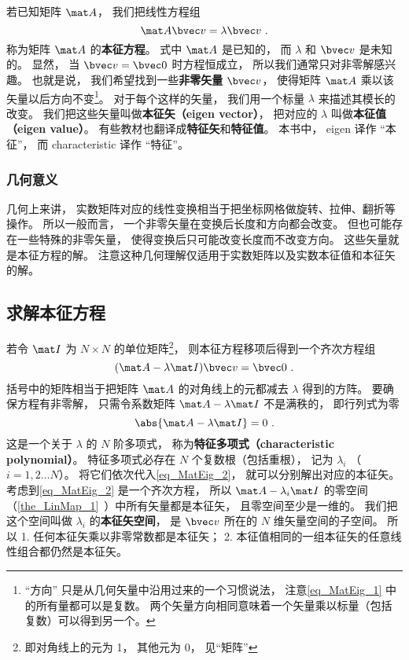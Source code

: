 

若已知矩阵 $\mat A$， 我们把线性方程组
\begin{equation}\label{eq_MatEig_1}
\mat A \bvec v = \lambda \bvec v~.
\end{equation}
称为矩阵 $\mat A$ 的\textbf{本征方程}。 式中 $\mat A$ 是已知的， 而 $\lambda$ 和 $\bvec v$ 是未知的。 显然， 当 $\bvec v = \bvec 0$ 时方程恒成立， 所以我们通常只对非零解感兴趣。 也就是说， 我们希望找到一些\textbf{非零矢量} $\bvec v$， 使得矩阵 $\mat A$ 乘以该矢量以后方向不变\footnote{“方向” 只是从几何矢量中沿用过来的一个习惯说法， 注意\autoref{eq_MatEig_1} 中的所有量都可以是复数。 两个矢量方向相同意味着一个矢量乘以标量（包括复数）可以得到另一个。}。 对于每个这样的矢量， 我们用一个标量 $\lambda$ 来描述其模长的改变。 我们把这些矢量叫做\textbf{本征矢（eigen vector）}， 把对应的 $\lambda$ 叫做\textbf{本征值（eigen value）}。 有些教材也翻译成\textbf{特征矢}和\textbf{特征值}。 本书中， eigen 译作 “本征”， 而 characteristic 译作 “特征”。

\subsubsection{几何意义}
几何上来讲， 实数矩阵对应的线性变换相当于把坐标网格做旋转、拉伸、翻折等操作。%
所以一般而言， 一个非零矢量在变换后长度和方向都会改变。 但也可能存在一些特殊的非零矢量， 使得变换后只可能改变长度而不改变方向。 这些矢量就是本征方程的解。 注意这种几何理解仅适用于实数矩阵以及实数本征值和本征矢的解。

\subsection{求解本征方程}\label{sub_MatEig_1}

若令 $\mat I$ 为 $N\times N$ 的单位矩阵\footnote{即对角线上的元为 1， 其他元为 0， 见“矩阵”}， 则本征方程移项后得到一个齐次方程组
\begin{equation}\label{eq_MatEig_2}
(\mat A - \lambda\mat I)\bvec v = \bvec 0~.
\end{equation}
括号中的矩阵相当于把矩阵 $\mat A$ 的对角线上的元都减去 $\lambda$ 得到的方阵。 要确保方程有非零解， 只需令系数矩阵 $\mat A - \lambda\mat I$ 不是满秩的， 即行列式为零
\begin{equation}\label{eq_MatEig_4}
\abs{\mat A - \lambda\mat I} = 0~.
\end{equation}
这是一个关于 $\lambda$ 的 $N$ 阶多项式， 称为\textbf{特征多项式（characteristic polynomial）}。 特征多项式必存在 $N$ 个复数根（包括重根），%
记为 $\lambda_i$ （$i = 1, 2\dots N$）。 将它们依次代入\autoref{eq_MatEig_2}， 就可以分别解出对应的本征矢。 考虑到\autoref{eq_MatEig_2} 是一个齐次方程， 所以 $\mat A - \lambda_i\mat I$ 的零空间（\autoref{the_LinMap_1}~）中所有矢量都是本征矢， 且零空间至少是一维的。 我们把这个空间叫做 $\lambda_i$ 的\textbf{本征矢空间}， 是 $\bvec v$ 所在的 $N$ 维矢量空间的子空间。 所以 1. 任何本征矢乘以非零常数都是本征矢； 2. 本征值相同的一组本征矢的任意线性组合都仍然是本征矢。

